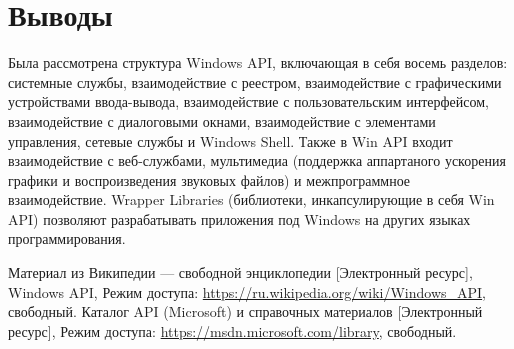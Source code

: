     \section{Выводы}
    Была рассмотрена структура Windows API, включающая в себя восемь разделов: системные службы, взаимодействие с реестром, взаимодействие с графическими устройствами ввода-вывода, взаимодействие с пользовательским интерфейсом, взаимодействие с диалоговыми окнами, взаимодействие с элементами управления, сетевые службы и Windows Shell.
    Также в Win API входит взаимодействие с веб-службами, мультимедиа (поддержка аппартаного ускорения графики и воспроизведения звуковых файлов) и межпрограммное взаимодействие. Wrapper Libraries (библиотеки, инкапсулирующие в себя Win API) позволяют разрабатывать приложения под Windows на других языках программирования.
    \begin{thebibliography}{9}
         Материал из Википедии — свободной энциклопедии [Электронный ресурс], Windows API, Режим доступа: \url{https://ru.wikipedia.org/wiki/Windows_API}, свободный.
         Каталог API (Microsoft) и справочных материалов [Электронный ресурс], Режим доступа: \url{https://msdn.microsoft.com/library}, свободный.
    \end{thebibliography}


